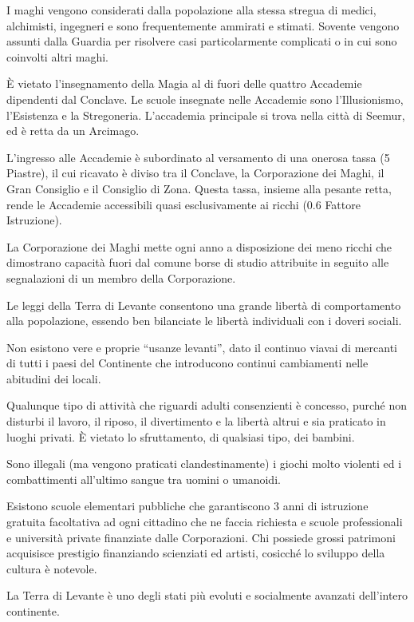\iffullversion
I maghi vengono considerati dalla popolazione alla stessa stregua di
medici, alchimisti, ingegneri e sono frequentemente ammirati e
stimati.  Sovente vengono assunti dalla Guardia per risolvere casi
particolarmente complicati o in cui sono coinvolti altri maghi.
\fi

\`E vietato l'insegnamento della Magia al di fuori delle quattro
Accademie dipendenti dal Conclave. Le scuole insegnate nelle Accademie
sono l'Illusionismo, l'Esistenza e la Stregoneria. L'accademia
principale si trova nella citt\`a di Seemur, ed \`e retta da un
Arcimago.

\iffullversion
L'ingresso alle Accademie \`e subordinato al versamento di una onerosa
tassa (5 Piastre), il cui ricavato \`e diviso tra il Conclave, la
Corporazione dei Maghi, il Gran Consiglio e il Consiglio di Zona.
Questa tassa, insieme alla pesante retta, rende le Accademie
accessibili quasi esclusivamente ai ricchi (0.6 Fattore Istruzione).

La Corporazione dei Maghi mette ogni anno a disposizione dei meno
ricchi che dimostrano capacit\`a fuori dal comune borse di studio
attribuite in seguito alle segnalazioni di un membro della
Corporazione.
\fi

\Moda Le leggi della Terra di Levante consentono una grande libert\`a di
comportamento alla popolazione, essendo ben bilanciate le libert\`a
individuali con i doveri sociali.

Non esistono vere e proprie ``usanze levanti'', dato il continuo
viavai di mercanti di tutti i paesi del Continente che introducono
continui cambiamenti nelle abitudini dei locali.

\iffullversion
Qualunque tipo di attivit\`a che riguardi adulti consenzienti \`e
concesso, purch\'e non disturbi il lavoro, il riposo, il divertimento
e la libert\`a altrui e sia praticato in luoghi privati. \`E vietato
lo sfruttamento, di qualsiasi tipo, dei bambini.

Sono illegali (ma vengono praticati clandestinamente) i giochi
molto violenti ed i combattimenti all'ultimo sangue tra uomini
o umanoidi.

Esistono scuole elementari pubbliche che garantiscono 3 anni di
istruzione gratuita facoltativa ad ogni cittadino che ne faccia
richiesta e scuole professionali e universit\`a private finanziate
dalle Corporazioni.  Chi possiede grossi patrimoni acquisisce
prestigio finanziando scienziati ed artisti, cosicch\'e lo sviluppo
della cultura \`e notevole.

La Terra di Levante \`e uno degli stati pi\`u evoluti e socialmente
avanzati dell'intero continente.

